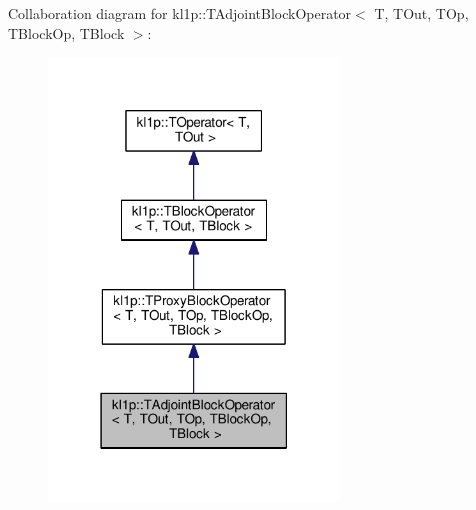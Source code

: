 Collaboration diagram for kl1p\+:\+:T\+Adjoint\+Block\+Operator$<$ T, T\+Out, T\+Op, T\+Block\+Op, T\+Block $>$\+:
\nopagebreak
\begin{figure}[H]
\begin{center}
\leavevmode
\includegraphics[width=219pt]{classkl1p_1_1TAdjointBlockOperator__coll__graph}
\end{center}
\end{figure}
